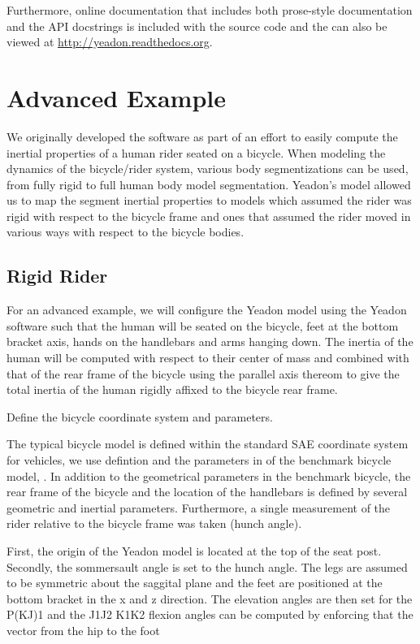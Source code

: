 \documentclass[10pt]{article}
\begin{document}
Furthermore, online documentation that includes both prose-style documentation
and the API docstrings is included with the source code and the can also be
viewed at \url{http://yeadon.readthedocs.org}.

\section*{Advanced Example}
\label{sec:advanced-example}

We originally developed the software as part of an effort to easily compute the
inertial properties of a human rider seated on a bicycle. When modeling the
dynamics of the bicycle/rider system, various body segmentizations can be used,
from fully rigid to full human body model segmentation. Yeadon's model allowed
us to map the segment inertial properties to models which assumed the rider
was rigid with respect to the bicycle frame and ones that assumed the rider
moved in various ways with respect to the bicycle bodies.

\subsection*{Rigid Rider}
\label{sec:rigid-rider}

For an advanced example, we will configure the Yeadon model using the Yeadon
software such that the human will be seated on the bicycle, feet at the bottom
bracket axis, hands on the handlebars and arms hanging down. The inertia of the
human will be computed with respect to their center of mass and combined with
that of the rear frame of the bicycle using the parallel axis thereom to give
the total inertia of the human rigidly affixed to the bicycle rear frame.

Define the bicycle coordinate system and parameters.

The typical bicycle model is defined within the standard SAE coordinate system
for vehicles, we use defintion and the parameters in of the benchmark bicycle
model, \cite{Meijaard2007}. In addition to the geometrical parameters in the
benchmark bicycle, the rear frame of the bicycle and the location of the
handlebars is defined by several geometric and inertial parameters.
Furthermore, a single measurement of the rider relative to the bicycle frame
was taken (hunch angle).

First, the origin of the Yeadon model is located at the top of the seat post.
Secondly, the sommersault angle is set to the hunch angle. The legs are assumed
to be symmetric about the saggital plane and the feet are positioned at the
bottom bracket in the x and z direction. The elevation angles are then set for
the P(KJ)1 and the J1J2 K1K2 flexion angles can be computed by enforcing that
the vector from the hip to the foot
\end{document}
